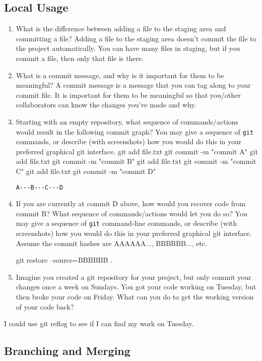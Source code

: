 \documentclass[10pt,twocolumn]{article}
\begin{document}
\subsection{Local Usage}

\begin{enumerate}
\item What is the difference between adding a file to the staging area and committing a file?
Adding a file to the staging area doesn't commit the file to the project automatically. You can have many files in staging, but if you commit a file, then only that file is there.
\item What is a commit message, and why is it important for them to be meaningful?
A  commit message is a message that you can tag along to your commit file. It is important for them to be meaningful so that you/other collaborators can know the changes you've made and why.
\item Starting with an empty repository, what sequence of commands/actions would result in the following commit graph? You may give a sequence of \texttt{git} commands, or describe (with screenshots) how you would do this in your preferred graphical git interface.
git add file.txt git commit -m "commit A"
git add file.txt git commit -m "commit B"
git add file.txt git commit -m "commit C"
git add file.txt git commit -m "commit D"
\begin{verbatim}
A---B---C---D
\end{verbatim}
\item If you are currently at commit D above, how would you recover code from commit B? What sequence of commands/actions would let you do so? You may give a sequence of \texttt{git} command-line commands, or describe (with screenshots) how you would do this in your preferred graphical git interface. Assume the commit hashes are AAAAAA..., BBBBBB..., etc.

git restore --source=BBBBBB .

\item Imagine you created a git repository for your project, but only commit your changes once a week on Sundays. You got your code working on Tuesday, but then broke your code on Friday. What can you do to get the working version of your code back?
\end{enumerate}
I could use git reflog to see if I can find my work on Tuesday.

\subsection{Branching and Merging}
\end{document}
